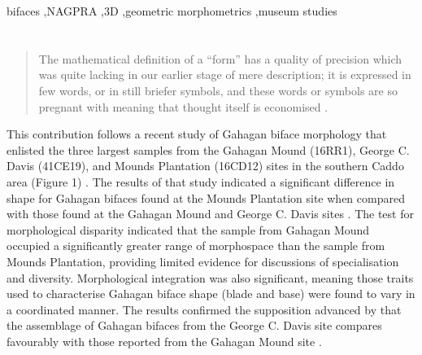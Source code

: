 \documentclass[review]{elsarticle}
\begin{document}
\begin{frontmatter}
\begin{keyword}
bifaces \sep NAGPRA \sep 3D \sep geometric morphometrics \sep museum studies
\end{keyword}

\end{frontmatter}

\linenumbers

\section*{}

\begin{quote}
The mathematical definition of a ``form'' has a quality of precision which was quite lacking in our earlier stage of mere description; it is expressed in few words, or in still briefer symbols, and these words or symbols are so pregnant with meaning that thought itself is economised \citep[720-721]{RN11532}.    
\end{quote}

This contribution follows a recent study of Gahagan biface morphology that enlisted the three largest samples from the Gahagan Mound (16RR1), George C. Davis (41CE19), and Mounds Plantation (16CD12) sites in the southern Caddo area (Figure 1) \citep{RN11783}. The results of that study indicated a significant difference in shape for Gahagan bifaces found at the Mounds Plantation site when compared with those found at the Gahagan Mound and George C. Davis sites \citep[Figure 7]{RN11783}. The test for morphological disparity indicated that the sample from Gahagan Mound occupied a significantly greater range of morphospace than the sample from Mounds Plantation, providing limited evidence for discussions of specialisation and diversity. Morphological integration was also significant, meaning those traits used to characterise Gahagan biface shape (blade and base) were found to vary in a coordinated manner. The results confirmed the supposition advanced by \cite{RN3684} that the assemblage of Gahagan bifaces from the George C. Davis site compares favourably with those reported from the Gahagan Mound site \citep{RN5274,RN2740}.
\end{document}
